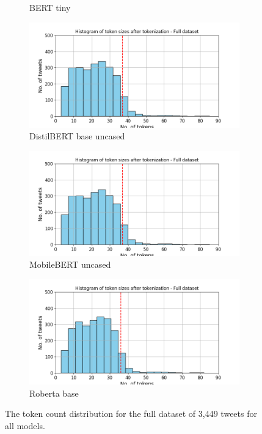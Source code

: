 \begin{figure}[htbp]
\begin{subfigure}[b]{0.48\textwidth}
        \caption{BERT tiny}
        \label{fig: token_pp_hist_tiny}
    \end{subfigure}
    \hfill
    \begin{subfigure}[b]{0.48\textwidth}
        \includegraphics[width=\textwidth]{figures/token_pp_hist_distilbert-base-uncased.png}
        \caption{DistilBERT base uncased}
        \label{fig: token_pp_hist_distilbert}
    \end{subfigure}
    \begin{subfigure}[b]{0.48\textwidth}
        \includegraphics[width=\textwidth]{figures/token_pp_hist_google-mobilebert-uncased.png}
        \caption{MobileBERT uncased}
        \label{fig: token_pp_hist_mobile}
    \end{subfigure}
    \hfill
    \begin{subfigure}[b]{0.48\textwidth}
        \includegraphics[width=\textwidth]{figures/token_pp_hist_roberta-base.png}
        \caption{Roberta base}
        \label{fig: token_pp_hist_roberta}
    \end{subfigure}
    \caption{The token count distribution for the full dataset of 3,449 tweets for all models.}
    \label{fig: apdxa_tokens}
\end{figure}